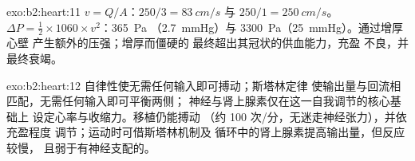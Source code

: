 \begin{solution}{exo:b2:heart:11}
$v = Q/A$：$250/3 = \qty{83}{cm/s}$ 与 $250/1 = \qty{250}{cm/s}$。
$\Delta P = \tfrac12\times 1060\times v^{2}$：\qty{365}{Pa}
（\qty{2.7}{mmHg}）与 \qty{3300}{Pa}（\qty{25}{mmHg}）。通过增厚心壁
产生额外的压强；增厚而僵硬的
最终超出其冠状的供血能力，充盈
不良，并最终衰竭。
\end{solution}

\begin{solution}{exo:b2:heart:12}
自律性使无需任何输入即可搏动；斯塔林定律
使输出量与回流相匹配，无需任何输入即可平衡两侧；
神经与肾上腺素仅在这一自我调节的核心基础上
设定心率与收缩力。移植仍能搏动
（约 100 次/分，无迷走神经张力），并依充盈程度
调节；运动时可借斯塔林机制及
循环中的肾上腺素提高输出量，但反应较慢，
且弱于有神经支配的。
\end{solution}

